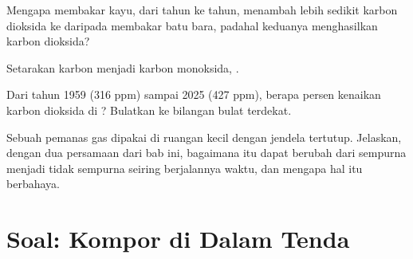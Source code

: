 \begin{exercise}[$\star\star$]\label{exo:g8:combustion-and-fuels:9}
Mengapa membakar kayu, dari tahun ke tahun, menambah lebih sedikit
karbon dioksida ke  daripada membakar batu bara, padahal keduanya
menghasilkan karbon dioksida?
\end{exercise}

\begin{exercise}[$\star\star$]\label{exo:g8:combustion-and-fuels:10}
Setarakan  karbon menjadi karbon monoksida,
. %
\end{exercise}

\begin{exercise}[$\star\star\star$]\label{exo:g8:combustion-and-fuels:11}
Dari tahun 1959 (316 ppm) sampai 2025 (427 ppm), berapa persen kenaikan
karbon dioksida di ? Bulatkan ke bilangan bulat terdekat.
\end{exercise}

\begin{exercise}[$\star\star\star$]\label{exo:g8:combustion-and-fuels:12}
Sebuah pemanas gas dipakai di ruangan kecil dengan jendela tertutup.
Jelaskan, dengan dua persamaan dari bab ini, bagaimana  itu
dapat berubah dari sempurna menjadi tidak sempurna seiring berjalannya
waktu, dan mengapa hal itu berbahaya.
\end{exercise}

\section{Soal: Kompor di Dalam Tenda}

